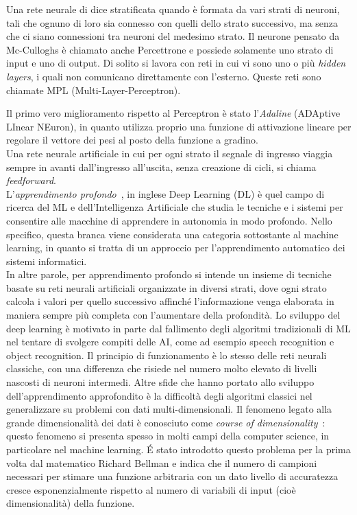 Una rete neurale di dice stratificata quando è formata da vari strati di neuroni, 
tali che ognuno di loro sia connesso con quelli dello strato successivo, ma senza che ci 
siano connessioni tra neuroni del medesimo strato. 
Il neurone pensato da Mc-Culloghs è chiamato anche Percettrone e possiede solamente uno strato di input e uno di output.
Di solito si lavora con reti in cui vi sono uno o più \emph{hidden layers}, 
i quali non comunicano direttamente con l’esterno. Queste reti sono chiamate MPL (Multi-Layer-Perceptron). 

Il primo vero miglioramento rispetto al Perceptron è stato l’\emph{Adaline} (ADAptive LInear NEuron), 
in quanto utilizza proprio una funzione di attivazione lineare per regolare il vettore 
dei pesi al posto della funzione a gradino. \\


Una rete neurale artificiale in cui per ogni strato il segnale di ingresso viaggia
sempre in avanti dall’ingresso all’uscita, senza creazione di cicli, si chiama \emph{feedforward}. \\




L'\emph{apprendimento profondo}~\cite{dl}, in inglese Deep Learning (DL) è quel campo di ricerca del ML 
e dell'Intelligenza Artificiale che studia le tecniche e i sistemi per consentire alle macchine 
di apprendere in autonomia in modo profondo. Nello specifico, questa branca viene considerata una
 categoria sottostante al machine learning, in quanto si tratta di un approccio per l’apprendimento
  automatico dei sistemi informatici. \\
  In altre parole, per apprendimento profondo
   si intende un insieme
   di tecniche basate su reti neurali artificiali organizzate in diversi strati, dove ogni strato calcola
    i valori per quello successivo affinché l'informazione venga elaborata in maniera sempre più completa
     con l’aumentare della profondità. Lo sviluppo del deep learning è motivato in parte dal fallimento
      degli algoritmi
      tradizionali di ML nel tentare di svolgere compiti delle AI, come ad esempio speech recognition e object recognition. 
      Il principio di funzionamento è lo stesso delle reti neurali classiche, con una differenza
       che risiede nel numero molto elevato di livelli nascosti di neuroni intermedi.
       Altre sfide che hanno portato allo sviluppo dell’apprendimento approfondito è la difficoltà
       degli algoritmi classici nel generalizzare su problemi con dati multi-dimensionali.
       Il fenomeno legato alla grande dimensionalità dei dati è conosciuto come \emph{course of 
       dimensionality}~\cite{dim}: questo fenomeno si presenta spesso in molti campi della computer science,
        in particolare nel machine learning. É stato introdotto questo problema per la prima volta
         dal matematico Richard Bellman e indica che il numero di campioni necessari per
          stimare una funzione arbitraria con un dato livello di accuratezza
           cresce esponenzialmente rispetto al numero di variabili di input
            (cioè dimensionalità) della funzione.
             
